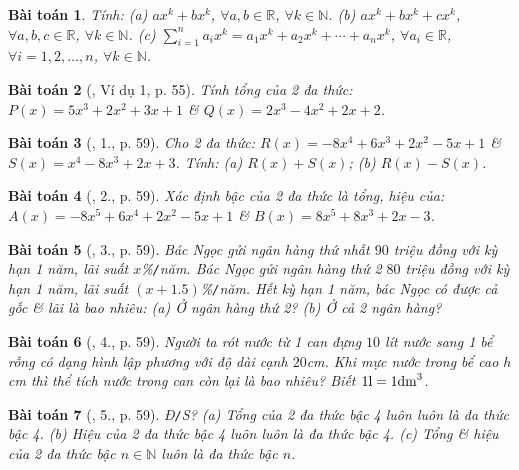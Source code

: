 \documentclass{article}
\newtheorem{baitoan}{Bài toán}
\begin{document}
\begin{baitoan}
	Tính: (a) $ax^k + bx^k$, $\forall a,b\in\mathbb{R}$, $\forall k\in\mathbb{N}$. (b) $ax^k + bx^k + cx^k$, $\forall a,b,c\in\mathbb{R}$, $\forall k\in\mathbb{N}$. (c) $\sum_{i=1}^n a_ix^k = a_1x^k + a_2x^k + \cdots + a_nx^k$, $\forall a_i\in\mathbb{R}$, $\forall i = 1,2,\ldots,n$, $\forall k\in\mathbb{N}$.
\end{baitoan}

\begin{baitoan}[\cite{SGK_Toan_7_Canh_Dieu_tap_2}, Ví dụ 1, p. 55]
	Tính tổng của 2 đa thức: $P(x) = 5x^3 + 2x^2 + 3x + 1$ \& $Q(x) = 2x^3 - 4x^2 + 2x + 2$.
\end{baitoan}

\begin{baitoan}[\cite{SGK_Toan_7_Canh_Dieu_tap_2}, 1., p. 59]
	Cho 2 đa thức: $R(x) = -8x^4 + 6x^3 + 2x^2 - 5x + 1$ \& $S(x) = x^4 - 8x^3 + 2x + 3$. Tính: (a) $R(x) + S(x)$; (b) $R(x) - S(x)$.
\end{baitoan}

\begin{baitoan}[\cite{SGK_Toan_7_Canh_Dieu_tap_2}, 2., p. 59]
	Xác định bậc của 2 đa thức là tổng, hiệu của: $A(x) = -8x^5 + 6x^4 + 2x^2 - 5x + 1$ \& $B(x) = 8x^5 + 8x^3 + 2x - 3$.
\end{baitoan}

\begin{baitoan}[\cite{SGK_Toan_7_Canh_Dieu_tap_2}, 3., p. 59]
	Bác Ngọc gửi ngân hàng thứ nhất $90$ triệu đồng với kỳ hạn 1 năm, lãi suất $x$\%\emph{\texttt{/}}năm. Bác Ngọc gửi ngân hàng thứ 2 $80$ triệu đồng với kỳ hạn 1 năm, lãi suất $(x + 1.5)$\%\emph{\texttt{/}}năm. Hết kỳ hạn 1 năm, bác Ngọc có được cả gốc \& lãi là bao nhiêu: (a) Ở ngân hàng thứ 2? (b) Ở cả 2 ngân hàng?
\end{baitoan}

\begin{baitoan}[\cite{SGK_Toan_7_Canh_Dieu_tap_2}, 4., p. 59]
	Người ta rót nước từ 1 can đựng $10$ lít nước sang 1 bể rỗng có dạng hình lập phương với độ dài cạnh $20$\emph{cm}. Khi mực nước trong bể cao $h$ \emph{cm} thì thể tích nước trong can còn lại là bao nhiêu? Biết $1{\rm l} = 1{\rm dm}^3$.
\end{baitoan}

\begin{baitoan}[\cite{SGK_Toan_7_Canh_Dieu_tap_2}, 5., p. 59]
	\emph{Đ\texttt{/}S?} (a) Tổng của 2 đa thức bậc 4 luôn luôn là đa thức bậc 4. (b) Hiệu của 2 đa thức bậc 4 luôn luôn là đa thức bậc 4. (c) Tổng \& hiệu của 2 đa thức bậc $n\in\mathbb{N}$ luôn là đa thức bậc $n$.
\end{baitoan}
\end{document}
